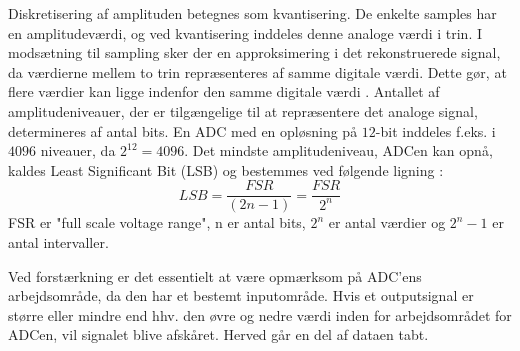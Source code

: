 Diskretisering af amplituden betegnes som kvantisering. De enkelte samples har en amplitudeværdi, og ved kvantisering inddeles denne analoge værdi i trin. I modsætning til sampling sker der en approksimering i det rekonstruerede signal, da værdierne mellem to trin repræsenteres af samme digitale værdi. Dette gør, at flere værdier kan ligge indenfor den samme digitale værdi \cite{Zouridakis2003}. Antallet af amplitudeniveauer, der er tilgængelige til at repræsentere det analoge signal, determineres af antal bits. En ADC med en opløsning på $12$-bit inddeles f.eks. i $4096$ niveauer, da $2^{12}=4096$. \cite{Konrad2006} Det mindste amplitudeniveau, ADCen kan opnå, kaldes Least Significant Bit (LSB) og bestemmes ved følgende ligning \cite{webster2009,Wolf2004,Aminoff2012}:
\begin{equation}\label{ligningLSB}
LSB = \frac{FSR}{(2n-1)} = \frac{FSR}{2^{n}}
\end{equation}
FSR er "full scale voltage range", n er antal bits, $2^n$ er antal værdier og $2^{n}-1$ er antal intervaller. 

Ved forstærkning er det essentielt at være opmærksom på ADC'ens arbejdsområde, da den har et bestemt inputområde. Hvis et outputsignal er større eller mindre end hhv. den øvre og nedre værdi inden for arbejdsområdet for ADCen, vil signalet blive afskåret. Herved går en del af dataen tabt. \cite{webster2009,Wolf2004,Aminoff2012}